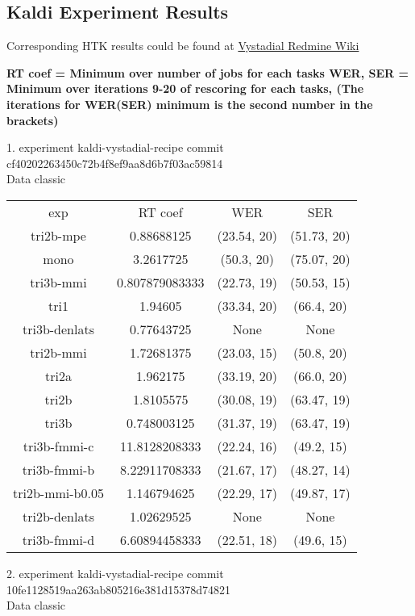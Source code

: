 \subsection{Kaldi Experiment Results} %
\label{sub:Experiment results}

Corresponding HTK results could be found at
\href{https://redmine.ms.mff.cuni.cz/projects/vystadial/wiki/Acoustic_models/} {Vystadial Redmine Wiki}


{\bf RT coef = Minimum over number of jobs for each tasks
WER, SER = Minimum over iterations 9-20 of rescoring for each tasks, 
(The iterations for WER(SER) minimum is the second number in the brackets)}


1. experiment kaldi-vystadial-recipe commit cf40202263450c72b4f8ef9aa8d6b7f03ac59814\\
Data classic

\begin{tabular}{cccc}
exp             & RT coef        & WER         & SER        \\
tri2b-mpe       & 0.88688125     & (23.54, 20) & (51.73, 20)\\
mono            & 3.2617725      & (50.3, 20)  & (75.07, 20)\\
tri3b-mmi       & 0.807879083333 & (22.73, 19) & (50.53, 15)\\
tri1            & 1.94605        & (33.34, 20) & (66.4, 20) \\
tri3b-denlats   & 0.77643725     & None        & None       \\
tri2b-mmi       & 1.72681375     & (23.03, 15) & (50.8, 20) \\
tri2a           & 1.962175       & (33.19, 20) & (66.0, 20) \\
tri2b           & 1.8105575      & (30.08, 19) & (63.47, 19)\\
tri3b           & 0.748003125    & (31.37, 19) & (63.47, 19)\\
tri3b-fmmi-c    & 11.8128208333  & (22.24, 16) & (49.2, 15) \\
tri3b-fmmi-b    & 8.22911708333  & (21.67, 17) & (48.27, 14)\\
tri2b-mmi-b0.05 & 1.146794625    & (22.29, 17) & (49.87, 17)\\
tri2b-denlats   & 1.02629525     & None        & None       \\
tri3b-fmmi-d    & 6.60894458333  & (22.51, 18) & (49.6, 15)
\end{tabular}


2. experiment kaldi-vystadial-recipe commit 10fe1128519aa263ab805216e381d15378d74821\\
Data classic

